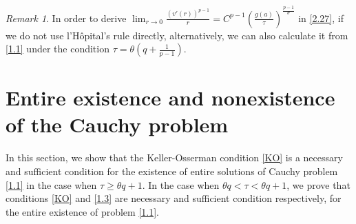 \documentclass[a4paper,11pt]{amsart}
\theoremstyle{plain}
\theoremstyle{remark}
\newtheorem{remark}{Remark}
\numberwithin{equation}{section}
\numberwithin{figure}{section}
\numberwithin{remark}{section}
\begin{document}
\begin{sloppypar}
\begin{remark}
In order to derive $\lim_{r\to 0} \frac{(v'(r))^{p-1}}{r}  = C^{p-1} \left (\frac{g(a)}{\tau}\right)^{\frac{p-1}{\theta}}$ in \eqref{2.27}, if we do not use l'H\^opital's rule directly, alternatively, we can also calculate it from \eqref{1.1} under the condition $\tau = \theta(q+\frac{1}{p-1})$.
\end{remark}


\vspace{3mm}

\section{Entire existence and nonexistence of the Cauchy problem}\label{Section 3}

\sloppy{}

In this section, we show that the Keller-Osserman condition \eqref{KO} is a necessary and sufficient condition for the existence of entire solutions of Cauchy problem \eqref{1.1} in the case when $\tau \ge \theta q+1$. In the case when $\theta q < \tau < \theta q +1$, we prove that conditions \eqref{KO} and \eqref{1.3} are necessary and sufficient condition respectively, for the entire existence of problem \eqref{1.1}.


\end{sloppypar}
\end{document}
